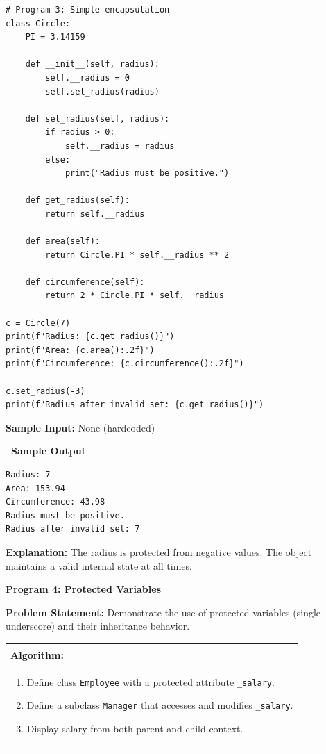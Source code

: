 \documentclass[12pt,a4paper]{article}
\makeatletter
\newcommand{\outhead}{\noindent\colorbox{cmrgreen!25}%
  {\textbf{\small\color{cmrdark}~Sample Output~}}\par\vspace{-1pt}}
\newenvironment{algobox}{%
  \par\vspace{4pt}%
  \noindent\begin{tabular}{@{}p{\linewidth}@{}}%
  \hline\\[-8pt]%
  \textbf{\color{blue!60!black}\small Algorithm:}\\[2pt]%
}{%
  \\[-4pt]\hline%
  \end{tabular}\par\vspace{4pt}%
}
\makeatother
\begin{document}
\begin{lstlisting}
# Program 3: Simple encapsulation
class Circle:
    PI = 3.14159

    def __init__(self, radius):
        self.__radius = 0
        self.set_radius(radius)

    def set_radius(self, radius):
        if radius > 0:
            self.__radius = radius
        else:
            print("Radius must be positive.")

    def get_radius(self):
        return self.__radius

    def area(self):
        return Circle.PI * self.__radius ** 2

    def circumference(self):
        return 2 * Circle.PI * self.__radius

c = Circle(7)
print(f"Radius: {c.get_radius()}")
print(f"Area: {c.area():.2f}")
print(f"Circumference: {c.circumference():.2f}")

c.set_radius(-3)
print(f"Radius after invalid set: {c.get_radius()}")
\end{lstlisting}

\textbf{Sample Input:} None (hardcoded)

\outhead
\begin{lstlisting}[style=outputstyle]
Radius: 7
Area: 153.94
Circumference: 43.98
Radius must be positive.
Radius after invalid set: 7
\end{lstlisting}

\textbf{Explanation:} The radius is protected from negative values. The object maintains a valid internal state at all times.

\vspace{0.5cm}

\textbf{Program 4: Protected Variables}

\textbf{Problem Statement:}
Demonstrate the use of protected variables (single underscore) and their inheritance behavior.

\begin{algobox}
\begin{enumerate}[label=Step \arabic*:]
  \item Define class \texttt{Employee} with a protected attribute \texttt{\_salary}.
  \item Define a subclass \texttt{Manager} that accesses and modifies \texttt{\_salary}.
  \item Display salary from both parent and child context.
\end{enumerate}
\end{algobox}
\end{document}
